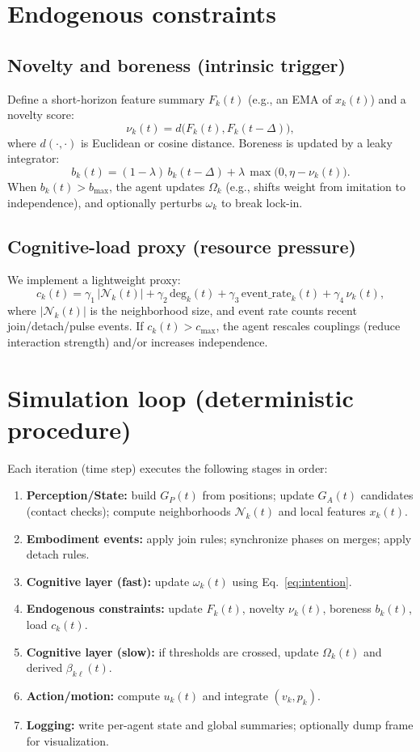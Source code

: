 \documentclass[11pt]{article}
\newcommand{\Neigh}{\mathcal{N}} %
\newcommand{\nov}{\nu}          %
\begin{document}
\section{Endogenous constraints}
\subsection{Novelty and boreness (intrinsic trigger)}
Define a short-horizon feature summary $F_k(t)$ (e.g., an EMA of $x_k(t)$) and a novelty score:
\[
\nov_k(t) = d\bigl(F_k(t),F_k(t-\Delta)\bigr),
\]
where $d(\cdot,\cdot)$ is Euclidean or cosine distance.
Boreness is updated by a leaky integrator:
\[
b_k(t)=(1-\lambda)\,b_k(t-\Delta)+\lambda\,\max\bigl(0,\eta - \nov_k(t)\bigr).
\]
When $b_k(t)>b_{\max}$, the agent updates $\Omega_k$ (e.g., shifts weight from imitation to independence),
and optionally perturbs $\omega_k$ to break lock-in.

\subsection{Cognitive-load proxy (resource pressure)}
We implement a lightweight proxy:
\[
c_k(t) = \gamma_1\,|\Neigh_k(t)| + \gamma_2\,\text{deg}_k(t) + \gamma_3\,\text{event\_rate}_k(t) + \gamma_4\,\nov_k(t),
\]
where $|\Neigh_k(t)|$ is the neighborhood size, and event rate counts recent join/detach/pulse events.
If $c_k(t)>c_{\max}$, the agent rescales couplings (reduce interaction strength) and/or increases independence.

\section{Simulation loop (deterministic procedure)}
Each iteration (time step) executes the following stages in order:

\begin{enumerate}[leftmargin=2.2em]
\item \textbf{Perception/State:} build $G_P(t)$ from positions; update $G_A(t)$ candidates (contact checks);
compute neighborhoods $\Neigh_k(t)$ and local features $x_k(t)$.
\item \textbf{Embodiment events:} apply join rules; synchronize phases on merges; apply detach rules.
\item \textbf{Cognitive layer (fast):} update $\omega_k(t)$ using Eq.~\eqref{eq:intention}.
\item \textbf{Endogenous constraints:} update $F_k(t)$, novelty $\nov_k(t)$, boreness $b_k(t)$, load $c_k(t)$.
\item \textbf{Cognitive layer (slow):} if thresholds are crossed, update $\Omega_k(t)$ and derived $\beta_{k\ell}(t)$.
\item \textbf{Action/motion:} compute $u_k(t)$ and integrate $(v_k,p_k)$.
\item \textbf{Logging:} write per-agent state and global summaries; optionally dump frame for visualization.
\end{enumerate}
\end{document}
